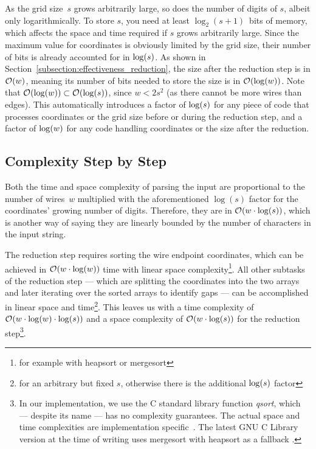 \documentclass[sigconf,nonacm,screen]{acmart}
\begin{document}
As the grid size~$s$ grows arbitrarily large, so does the number of digits of $s$, albeit only logarithmically. To store $s$, you need at least $\log_2(s+1)$~bits of memory, which affects the space and time required if $s$ grows arbitrarily large. Since the maximum value for coordinates is obviously limited by the grid size, their number of bits is already accounted for in $\log(s)$.
As shown in Section~\ref{subsection:effectiveness_reduction}, the size after the reduction step is in $\mathcal{O}\hspace{-0.15em}\left(w\right)$, meaning its number of bits needed to store the size is in $\mathcal{O}\hspace{-0.15em}\left(\log(w)\right)$.
Note that $\mathcal{O}\hspace{-0.15em}\left(\log(w)\right) \subset \mathcal{O}\hspace{-0.15em}\left(\log(s)\right)$, since $w<2s^2$ (as there cannot be more wires than edges).
This automatically introduces a factor of $\log(s)$ for any piece of code that processes coordinates or the grid size before or during the reduction step, and a factor of $\log(w)$ for any code handling coordinates or the size after the reduction.

\subsection{Complexity Step by Step}
Both the time and space complexity of parsing the input are proportional to the number of wires~$w$ multiplied with the aforementioned $\log(s)$ factor for the coordinates' growing number of digits. Therefore, they are in $\mathcal{O}\hspace{-0.15em}\left(w\cdot\log(s)\right)$, which is another way of saying they are linearly bounded by the number of characters in the input string.

The reduction step requires sorting the wire endpoint coordinates, which can be achieved in $\mathcal{O}\hspace{-0.15em}\left(w\cdot\log(w)\right)$ time with linear space complexity\footnote{for example with heapsort or mergesort}. All other subtasks of the reduction step --- which are splitting the coordinates into the two arrays and later iterating over the sorted arrays to identify gaps --- can be accomplished in linear space and time\footnote{for an arbitrary but fixed $s$, otherwise there is the additional $\log(s)$ factor}. This leaves us with a time complexity of $\mathcal{O}\hspace{-0.15em}\left(w\cdot\log(w)\cdot\log(s)\right)$ and a space complexity of $\mathcal{O}\hspace{-0.15em}\left(w\cdot\log(s)\right)$ for the reduction step\footnote{In our implementation, we use the C standard library function \emph{qsort}, which --- despite its name --- has no complexity guarantees. The actual space and time complexities are implementation specific~\cite{cppreference_qsort}. The latest GNU C Library version at the time of writing uses mergesort with heapsort as a fallback \cite{glibc}.}.
\end{document}
